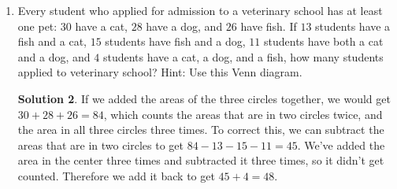 \documentclass{article}
\theoremstyle{definition}
\newtheorem*{solution}{Solution}
\begin{document}
\begin{enumerate}
\begin{solution}
            Another way to do this would be to recognize that a rectangle can be 
            defined by the position of its four sides. There are three ways to 
            choose two of the three horizontal lines to be the top and bottom of 
            the rectangle, and there are six ways to choose two of the four 
            vertical lines to be the sides of the rectangle, so there are $3 
            \cdot 6 = 18$ rectangles.
        \end{solution}
    \item Every student who applied for admission to a veterinary school has at 
        least one pet: $30$ have a cat, $28$ have a dog, and $26$ have fish. If 
        $13$ students have a fish and a cat, $15$ students have fish and a dog, 
        $11$ students have both a cat and a dog, and $4$ students have a cat, a 
        dog, and a fish, how many students applied to veterinary school? Hint: 
        Use this Venn diagram.
        \begin{center}
        \end{center}
        \begin{solution}
            If we added the areas of the three circles together, we would get 
            $30 + 28 + 26 = 84$, which counts the areas that are in two circles 
            twice, and the area in all three circles three times. To correct 
            this, we can subtract the areas that are in two circles to get $84 - 
            13 - 15 - 11 = 45$. We've added the area in the center three times 
            and subtracted it three times, so it didn't get counted. Therefore 
            we add it back to get $45 + 4 = 48$.
        \end{solution}
\end{enumerate}
\end{document}

